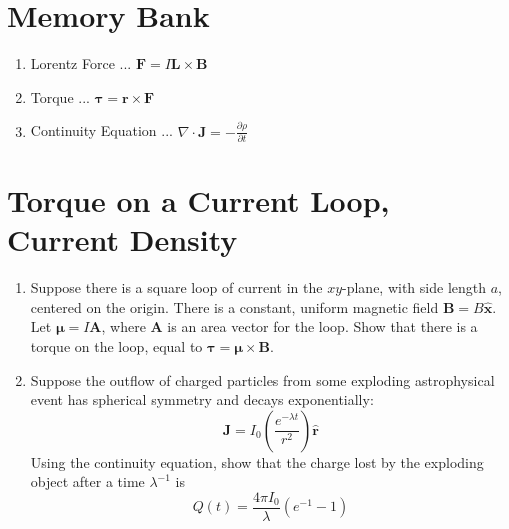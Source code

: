 \documentclass[12pt]{article}
\begin{document}
\maketitle
\small
\section{Memory Bank}
\begin{enumerate}
\item Lorentz Force ... $\mathbf{F} = I \mathbf{L} \times \mathbf{B}$
\item Torque ... $\boldsymbol\tau = \mathbf{r} \times \mathbf{F}$
\item Continuity Equation ... $\nabla \cdot \mathbf{J} = -\frac{\partial \rho}{\partial t}$
\end{enumerate}

\section{Torque on a Current Loop, Current Density}

\begin{enumerate}
\item Suppose there is a square loop of current in the $xy$-plane, with side length $a$, centered on the origin.  There is a constant, uniform magnetic field $\mathbf{B} = B \hat{\mathbf{x}}$.  Let $\boldsymbol\mu = I \mathbf{A}$, where $\mathbf{A}$ is an area vector for the loop.  Show that there is a torque on the loop, equal to $\boldsymbol\tau = \boldsymbol\mu \times \mathbf{B}$. \\ \vspace{5cm}
\item Suppose the outflow of charged particles from some exploding astrophysical event has spherical symmetry and decays exponentially:
\begin{equation}
\mathbf{J} = I_0 \left(\frac{e^{-\lambda t}}{r^2}\right)\hat{\mathbf{r}}
\end{equation}
Using the continuity equation, show that the charge lost by the exploding object after a time $\lambda^{-1}$ is 
\begin{equation}
Q(t) = \frac{4\pi I_0}{\lambda}\left(e^{-1} - 1\right)
\end{equation}
\end{enumerate}
\end{document}
